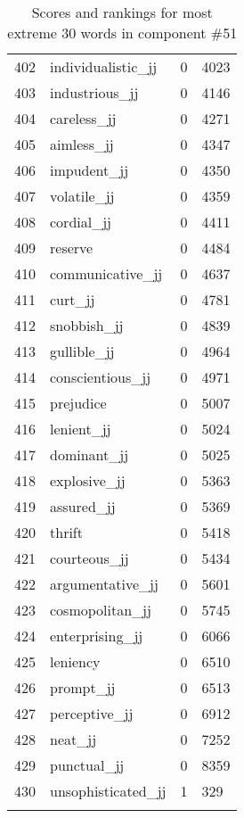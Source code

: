 \begin{longtable}[!htbp]{| rlr@{.}l |}
    402 & individualistic\_jj & 0 & 4023 \\
    403 & industrious\_jj & 0 & 4146 \\
    404 & careless\_jj & 0 & 4271 \\
    405 & aimless\_jj & 0 & 4347 \\
    406 & impudent\_jj & 0 & 4350 \\
    407 & volatile\_jj & 0 & 4359 \\
    408 & cordial\_jj & 0 & 4411 \\
    409 & reserve & 0 & 4484 \\
    410 & communicative\_jj & 0 & 4637 \\
    411 & curt\_jj & 0 & 4781 \\
    412 & snobbish\_jj & 0 & 4839 \\
    413 & gullible\_jj & 0 & 4964 \\
    414 & conscientious\_jj & 0 & 4971 \\
    415 & prejudice & 0 & 5007 \\
    416 & lenient\_jj & 0 & 5024 \\
    417 & dominant\_jj & 0 & 5025 \\
    418 & explosive\_jj & 0 & 5363 \\
    419 & assured\_jj & 0 & 5369 \\
    420 & thrift & 0 & 5418 \\
    421 & courteous\_jj & 0 & 5434 \\
    422 & argumentative\_jj & 0 & 5601 \\
    423 & cosmopolitan\_jj & 0 & 5745 \\
    424 & enterprising\_jj & 0 & 6066 \\
    425 & leniency & 0 & 6510 \\
    426 & prompt\_jj & 0 & 6513 \\
    427 & perceptive\_jj & 0 & 6912 \\
    428 & neat\_jj & 0 & 7252 \\
    429 & punctual\_jj & 0 & 8359 \\
    430 & unsophisticated\_jj & 1 & 329 \\
    \hline
    \caption{Scores and rankings for most extreme 30 words in component \#51} \\
\end{longtable}
